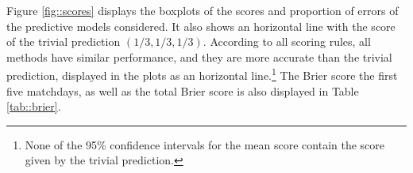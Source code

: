 \documentclass[journal,article,accept,moreauthors,pdftex,12pt,a4paper]{mdpi}
\begin{document}
%


Figure \ref{fig::scores} displays the boxplots of the scores and proportion of errors of the predictive models considered.
It also shows an horizontal line with the score of the trivial prediction $(1/3,1/3,1/3)$. 
According to all scoring rules, all methods have similar performance, and they are more accurate than the trivial prediction, displayed in the plots
as an horizontal line.\footnote{None of the 95\% confidence intervals for the mean score contain the score given by the trivial prediction.} The Brier score the first five matchdays, as well as the total Brier score is also displayed 
in Table \ref{tab::brier}.
\end{document}
